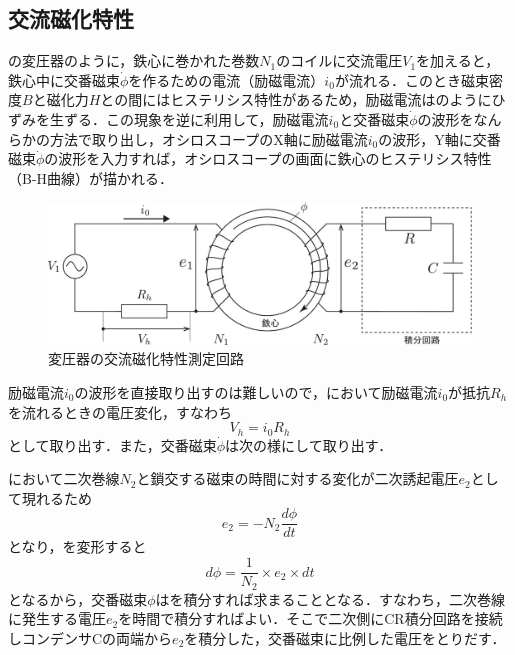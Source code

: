 \subsection{交流磁化特性}
\label{zika}
の変圧器のように，鉄心に巻かれた巻数$N_1$のコイルに交流電圧$V_1$を加えると，鉄心中に交番磁束$\dot{\phi}$を作るための電流（励磁電流）$i_0$が流れる．このとき磁束密度$B$と磁化力$H$との間にはヒステリシス特性があるため，励磁電流はのようにひずみを生ずる．この現象を逆に利用して，励磁電流$i_0$と交番磁束$\dot{\phi}$の波形をなんらかの方法で取り出し，オシロスコープのX軸に励磁電流$i_0$の波形，Y軸に交番磁束$\dot{\phi}$の波形を入力すれば，オシロスコープの画面に鉄心のヒステリシス特性（B-H曲線）が描かれる．
\begin{figure}[htbp]
	\centering
	\includegraphics[width=140mm]{fig/transformer.pdf}
	\caption{変圧器の交流磁化特性測定回路}
	\label{fig:hys:transformer}
\end{figure}

励磁電流$i_0$の波形を直接取り出すのは難しいので，において励磁電流$i_0$が抵抗$R_h$を流れるときの電圧変化，すなわち
\begin{equation}
	V_h = i_0R_h
\end{equation}
として取り出す．また，交番磁束$\dot{\phi}$は次の様にして取り出す．

において二次巻線$N_2$と鎖交する磁束の時間に対する変化が二次誘起電圧$e_2$として現れるため
\begin{equation}
	e_2 = -N_2\frac{d \phi}{dt}
	\label{eq:hys:e2}
\end{equation}
となり，を変形すると
\begin{equation}
	d \phi = \frac{1}{N_2}\times e_2\times dt
	\label{eq:hys:dphi}
\end{equation}
となるから，交番磁束$\phi$はを積分すれば求まることとなる．すなわち，二次巻線に発生する電圧$e_2$を時間で積分すればよい．そこで二次側にCR積分回路を接続しコンデンサCの両端から$e_2$を積分した，交番磁束に比例した電圧をとりだす．

